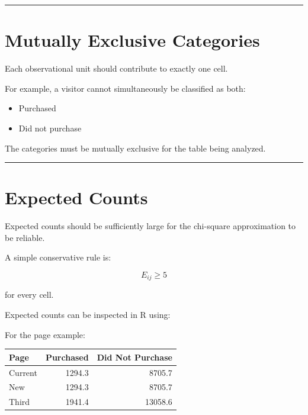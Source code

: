 \documentclass[
  letterpaper,
  DIV=11,
  numbers=noendperiod]{scrreprt}
\newenvironment{Shaded}{\begin{snugshade}}{\end{snugshade}}
\newcommand{\DecValTok}[1]{\textcolor[rgb]{0.68,0.00,0.00}{#1}}
\newcommand{\FunctionTok}[1]{\textcolor[rgb]{0.28,0.35,0.67}{#1}}
\newcommand{\NormalTok}[1]{\textcolor[rgb]{0.00,0.23,0.31}{#1}}
\newcommand{\SpecialCharTok}[1]{\textcolor[rgb]{0.37,0.37,0.37}{#1}}
\newcounter{none} %
\providecommand{\tightlist}{%
  \setlength{\itemsep}{0pt}\setlength{\parskip}{0pt}}
\begin{document}
\begin{center}\rule{0.5\linewidth}{0.5pt}\end{center}

\section{Mutually Exclusive
Categories}\label{mutually-exclusive-categories}

Each observational unit should contribute to exactly one cell.

For example, a visitor cannot simultaneously be classified as both:

\begin{itemize}
\tightlist
\item
  Purchased
\item
  Did not purchase
\end{itemize}

The categories must be mutually exclusive for the table being analyzed.

\begin{center}\rule{0.5\linewidth}{0.5pt}\end{center}

\section{Expected Counts}\label{expected-counts}

Expected counts should be sufficiently large for the chi-square
approximation to be reliable.

A simple conservative rule is:

\[
\boxed{
E_{ij}\geq5
}
\]

for every cell.

Expected counts can be inspected in R using:

\begin{Shaded}
\end{Shaded}

For the page example:

{\def\LTcaptype{none} %
\begin{longtable}[]{@{}lrr@{}}
\toprule\noalign{}
Page & Purchased & Did Not Purchase \\
\midrule\noalign{}
\endhead
\bottomrule\noalign{}
\endlastfoot
Current & 1294.3 & 8705.7 \\
New & 1294.3 & 8705.7 \\
Third & 1941.4 & 13058.6 \\
\end{longtable}
}
\end{document}
